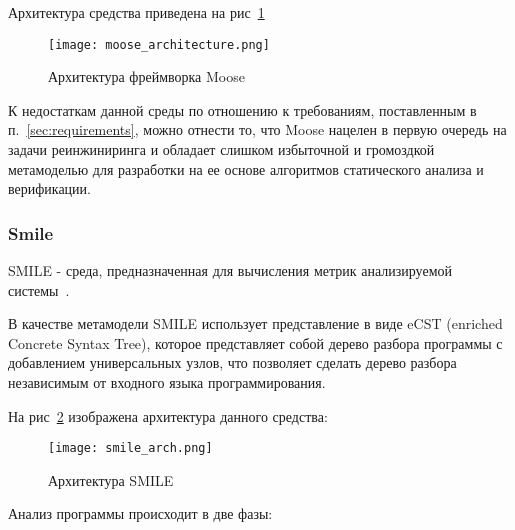 Архитектура средства приведена на рис~\ref{fig:moose_architecture}

\begin{figure}[h]
    \begin{center}
        \texttt{[image: moose\_architecture.png]}
    \end{center}
    \caption{Архитектура фреймворка Moose}
    \label{fig:moose_architecture}
\end{figure}

К недостаткам данной среды по отношению к требованиям, поставленным в
п.~\ref{sec:requirements}, можно отнести то, что Moose нацелен в первую очередь
на задачи реинжиниринга и обладает слишком избыточной и громоздкой метамоделью
для разработки на ее основе алгоритмов статического анализа и верификации.

\subsubsection{Smile}

SMILE - среда, предназначенная для вычисления метрик анализируемой
системы~\cite{smile}.

В качестве метамодели SMILE использует представление в виде eCST (enriched
Concrete Syntax Tree), которое представляет собой дерево разбора программы с
добавлением универсальных узлов, что позволяет сделать дерево разбора
независимым от входного языка программирования.

На рис~\ref{fig:smile_arch} изображена архитектура данного средства:

\begin{figure}[h!]
    \begin{center}
        \texttt{[image: smile\_arch.png]}
    \end{center}
    \caption{Архитектура SMILE}
    \label{fig:smile_arch}
\end{figure}

Анализ программы происходит в две фазы:

